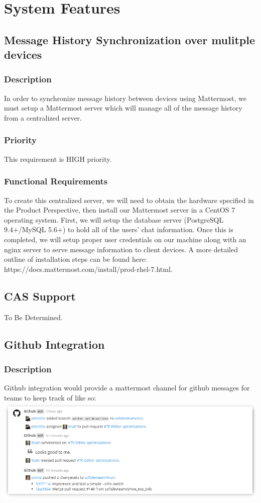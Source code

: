 \documentclass{scrreprt}
\begin{document}
\chapter{System Features}

\section{Message History Synchronization over mulitple devices}
\subsection{Description}
In order to synchronize message history between devices using
Mattermost, we must setup a Mattermost server which will manage all of
the message history from a centralized server.
\subsection{Priority}
This requirement is HIGH priority.
\subsection{Functional Requirements}
To create this centralized server, we will need to obtain the hardware
specified in the Product Perspective, then install our Mattermost
server in a CentOS 7 operating system.
First, we will setup the
database server (PostgreSQL 9.4+/MySQL 5.6+) to hold all of the users' chat
information.  Once this is completed, we will setup proper user credentials on
our machine along with an nginx server to serve message information to client
devices.  A more detailed outline of installation steps can be found here:
https://docs.mattermost.com/install/prod-rhel-7.html.

\section{CAS Support}
To Be Determined.

\section{Github Integration}
\subsection{Description}
Github integration would provide a mattermost channel for github messages for
teams to keep track of like so:\\
\includegraphics[scale=0.5, width=\textwidth]{github-integration.png}
\end{document}
